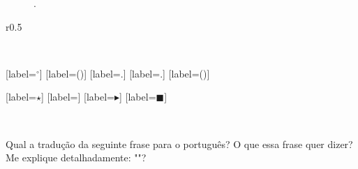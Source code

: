 \begin{figure}[h]
    \centering
    \caption{.}
    \label{fig:}
\end{figure}

\begin{wrapfigure}{r}{0.5\textwidth}
    \centering
    \caption{}
    \label{fig:}
\end{wrapfigure}

\begin{figure}[h]
    \centering
     \\ %
    \caption{}
    \label{fig:}
\end{figure}
  
\textcolor{DarkTurquoise}{\Large\LobsterTwo\textbf{}}
\textcolor{MediumOrchid}{\Large\LobsterTwo\textbf{}}
\textcolor{CarnationPink}{\Large\LobsterTwo\textbf{}}


[label=\textcolor{CarnationPink}{\arabic*${}^\circ$}]
[label=\textcolor{CarnationPink}{(\alph*)}]
[label=\textcolor{CarnationPink}{\roman*.}]
[label=\textcolor{CarnationPink}{\arabic*.}]
[label=\textcolor{CarnationPink}{(\roman*)}]


[label=\textcolor{CarnationPink}{$\star$}]
[label=\textcolor{CarnationPink}{\textopenbullet}]
[label=\textcolor{CarnationPink}{$\blacktriangleright$}]
[label=\textcolor{CarnationPink}{$\blacksquare$}]


\textcolor{CarnationPink}{$\mathbf{}$}
\textcolor{DarkTurquoise}{$\mathbf{}$}
\textcolor{MediumOrchid}{$\mathbf{}$}

\textcolor{DarkTurquoise}{\textbf{}}
\textcolor{MediumOrchid}{\textbf{}}


\begin{tcolorbox}[width=\textwidth, colback={white}, colbacktitle={DarkTurquoise!50!white}, title={$\bigstar$ \LobsterTwo{Observação} $\bigstar $}, coltitle={CarnationPink}, colframe={DarkTurquoise}, fonttitle=\rmfamily\bfseries\Large]

\end{tcolorbox}



Qual a tradução da seguinte frase para o português?  O que essa frase quer dizer? Me explique detalhadamente: ""?


